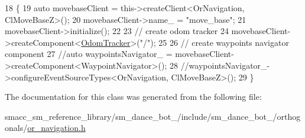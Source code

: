 \begin{DoxyCode}
18     \{
19         \textcolor{keyword}{auto} movebaseClient = this->createClient<OrNavigation, ClMoveBaseZ>();
20         movebaseClient->name\_ = \textcolor{stringliteral}{"move\_base"};
21         movebaseClient->initialize();
22 
23         \textcolor{comment}{// create odom tracker}
24         movebaseClient->createComponent<\hyperlink{classmove__base__z__client_1_1odom__tracker_1_1OdomTracker}{OdomTracker}>(\textcolor{stringliteral}{"/"});
25 
26         \textcolor{comment}{// create waypoints navigator component}
27         \textcolor{comment}{//auto waypointsNavigator\_ = movebaseClient->createComponent<WaypointNavigator>();}
28         \textcolor{comment}{//waypointsNavigator\_->configureEventSourceTypes<OrNavigation, ClMoveBaseZ>();}
29     \}
\end{DoxyCode}


The documentation for this class was generated from the following file\+:\begin{DoxyCompactItemize}
\item 
smacc\+\_\+sm\+\_\+reference\+\_\+library/sm\+\_\+dance\+\_\+bot\+\_/include/sm\+\_\+dance\+\_\+bot\+\_/orthogonals/\hyperlink{sm__dance__bot__2_2include_2sm__dance__bot__2_2orthogonals_2or__navigation_8h}{or\+\_\+navigation.\+h}\end{DoxyCompactItemize}
